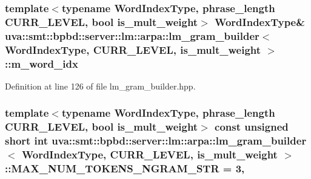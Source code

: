 \subsubsection[{m\+\_\+word\+\_\+idx}]{\setlength{\rightskip}{0pt plus 5cm}template$<$typename Word\+Index\+Type, phrase\+\_\+length C\+U\+R\+R\+\_\+\+L\+E\+V\+E\+L, bool is\+\_\+mult\+\_\+weight$>$ Word\+Index\+Type\& {\bf uva\+::smt\+::bpbd\+::server\+::lm\+::arpa\+::lm\+\_\+gram\+\_\+builder}$<$ Word\+Index\+Type, C\+U\+R\+R\+\_\+\+L\+E\+V\+E\+L, is\+\_\+mult\+\_\+weight $>$\+::m\+\_\+word\+\_\+idx\hspace{0.3cm}{\ttfamily [protected]}}\label{classuva_1_1smt_1_1bpbd_1_1server_1_1lm_1_1arpa_1_1lm__gram__builder_af9cf5c614babb6928aaec282d2a8eb94}


Definition at line 126 of file lm\+\_\+gram\+\_\+builder.\+hpp.

\hypertarget{classuva_1_1smt_1_1bpbd_1_1server_1_1lm_1_1arpa_1_1lm__gram__builder_a91ab45c8eefff09895b9d75d9848cab8}{}
\subsubsection[{M\+A\+X\+\_\+\+N\+U\+M\+\_\+\+T\+O\+K\+E\+N\+S\+\_\+\+N\+G\+R\+A\+M\+\_\+\+S\+T\+R}]{\setlength{\rightskip}{0pt plus 5cm}template$<$typename Word\+Index\+Type, phrase\+\_\+length C\+U\+R\+R\+\_\+\+L\+E\+V\+E\+L, bool is\+\_\+mult\+\_\+weight$>$ const unsigned short int {\bf uva\+::smt\+::bpbd\+::server\+::lm\+::arpa\+::lm\+\_\+gram\+\_\+builder}$<$ Word\+Index\+Type, C\+U\+R\+R\+\_\+\+L\+E\+V\+E\+L, is\+\_\+mult\+\_\+weight $>$\+::M\+A\+X\+\_\+\+N\+U\+M\+\_\+\+T\+O\+K\+E\+N\+S\+\_\+\+N\+G\+R\+A\+M\+\_\+\+S\+T\+R = 3\hspace{0.3cm}{\ttfamily [static]}, {\ttfamily [protected]}}\label{classuva_1_1smt_1_1bpbd_1_1server_1_1lm_1_1arpa_1_1lm__gram__builder_a91ab45c8eefff09895b9d75d9848cab8}


